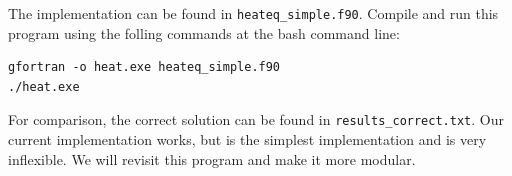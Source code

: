 \documentclass[11pt, letterpaper]{article}
\begin{document}
The implementation can be found in {\tt heateq\_simple.f90}.  Compile and run
this program using the folling commands at the bash command line:

\begin{verbatim}
gfortran -o heat.exe heateq_simple.f90 
./heat.exe 
\end{verbatim}

For comparison, the correct solution can be found in {\tt results\_correct.txt}.
Our current implementation works, but is the simplest implementation and is
very inflexible.  We will revisit this program and make it more modular.



\end{document}
